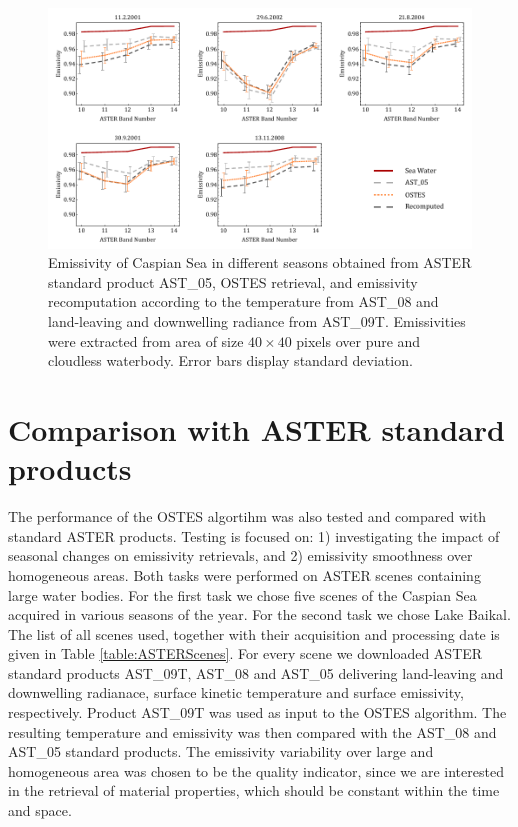 \begin{figure}[!t]
\centering
\includegraphics[width=7in]{pics/Chapter_03/pivov7}
\caption{Emissivity of Caspian Sea in different seasons obtained from ASTER standard product AST\_05, OSTES retrieval, and emissivity recomputation according to the temperature from AST\_08 and land-leaving and downwelling radiance from AST\_09T. Emissivities were extracted from area of size $40 \times 40$ pixels over pure and cloudless waterbody. Error bars display standard deviation.}
\label{fig:CaspianSeaEmissivity}
\end{figure}

\section{Comparison with ASTER standard products}

The performance of the OSTES algortihm was also tested and compared with standard ASTER products. Testing is focused on: 1) investigating the impact of seasonal changes on emissivity retrievals, and 2) emissivity smoothness over homogeneous areas. Both tasks were performed on ASTER scenes containing large water bodies. For the first task we chose five scenes of the Caspian Sea acquired in various seasons of the year. For the second task we chose Lake Baikal. The list of all scenes used, together with their acquisition and processing date is given in Table \ref{table:ASTERScenes}. For every scene we downloaded ASTER standard products AST\_09T, AST\_08 and AST\_05 delivering land-leaving and downwelling radianace, surface kinetic temperature and surface emissivity, respectively. Product AST\_09T was used as input to the OSTES algorithm. The resulting temperature and emissivity was then compared with the AST\_08 and AST\_05 standard products. The emissivity variability over large and homogeneous area was chosen to be the quality indicator, since we are interested in the retrieval of material properties, which should be constant within the time and space.

